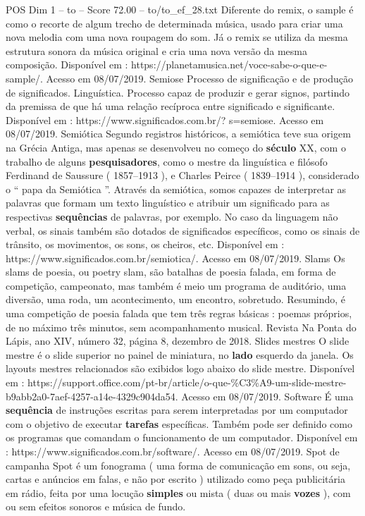 \begin{textsample}{POS Dim 1 – to – Score 72.00 – to/to\_ef\_28.txt}
Diferente do remix, o sample é como o recorte de algum trecho de determinada música, usado para criar uma nova melodia com uma nova roupagem do som.
Já o remix se utiliza da mesma estrutura sonora da música original e cria uma nova versão da mesma composição.
Disponível em : https://planetamusica.net/voce-sabe-o-que-e-sample/.
Acesso em 08/07/2019.
Semiose Processo de significação e de produção de significados.
Linguística.
Processo capaz de produzir e gerar signos, partindo da premissa de que há uma relação recíproca entre significado e significante.
Disponível em : https://www.significados.com.br/? s=semiose.
Acesso em 08/07/2019.
Semiótica Segundo registros históricos, a semiótica teve sua origem na Grécia Antiga, mas apenas se desenvolveu no começo do \textbf{século} XX, com o trabalho de alguns \textbf{pesquisadores}, como o mestre da linguística e filósofo Ferdinand de Saussure ( 1857–1913 ), e Charles Peirce ( 1839–1914 ), considerado o “ papa da Semiótica ”.
Através da semiótica, somos capazes de interpretar as palavras que formam um texto linguístico e atribuir um significado para as respectivas \textbf{sequências} de palavras, por exemplo.
No caso da linguagem não verbal, os sinais também são dotados de significados específicos, como os sinais de trânsito, os movimentos, os sons, os cheiros, etc.
Disponível em : https://www.significados.com.br/semiotica/.
Acesso em 08/07/2019.
Slams Os slams de poesia, ou poetry slam, são batalhas de poesia falada, em forma de competição, campeonato, mas também é meio um programa de auditório, uma diversão, uma roda, um acontecimento, um encontro, sobretudo.
Resumindo, é uma competição de poesia falada que tem três regras básicas : poemas próprios, de no máximo três minutos, sem acompanhamento musical.
Revista Na Ponta do Lápis, ano XIV, número 32, página 8, dezembro de 2018.
Slides mestres O slide mestre é o slide superior no painel de miniatura, no \textbf{lado} esquerdo da janela.
Os layouts mestres relacionados são exibidos logo abaixo do slide mestre.
Disponível em : https://support.office.com/pt-br/article/o-que-\%C3\%A9-um-slide-mestre-b9abb2a0-7aef-4257-a14e-4329c904da54.
Acesso em 08/07/2019.
Software É uma \textbf{sequência} de instruções escritas para serem interpretadas por um computador com o objetivo de executar \textbf{tarefas} específicas.
Também pode ser definido como os programas que comandam o funcionamento de um computador.
Disponível em : https://www.significados.com.br/software/.
Acesso em 08/07/2019.
Spot de campanha Spot é um fonograma ( uma forma de comunicação em sons, ou seja, cartas e anúncios em falas, e não por escrito ) utilizado como peça publicitária em rádio, feita por uma locução \textbf{simples} ou mista ( duas ou mais \textbf{vozes} ), com ou sem efeitos sonoros e música de fundo.

\end{textsample}
